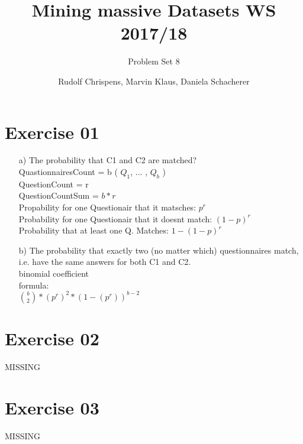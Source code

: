 \documentclass[11pt,a4paper]{scrartcl}
\title{Mining massive Datasets WS 2017/18}
\subtitle{Problem Set 8}
\author{Rudolf Chrispens, Marvin Klaus, Daniela Schacherer}
\begin{document}
\maketitle

\section*{Exercise 01}

\begin{itemize}
	\item[a)] The probability that C1 and C2 are matched?\\
	QuastionnairesCount = b ( $Q_1$, ... , $Q_b$ )\\
	QuestionCount = r \\
	QuestionCountSum = $b * r$\\
	Propability for one Questionair that it matsches: $p^r$\\
	Probability for one Questionair that it doesnt match: $(1-p)^r$\\ 
	Probability that at least one Q. Matches: $1-(1-p)^r$
	
	\item[b)] The probability that exactly two (no matter which) questionnaires match, i.e. have
the same answers for both C1 and C2.\\
	binomial coefficient\\
	formula: \\
	$\binom{b}{2} * (p^r)^2 * (1-(p^r))^{b-2}$

\end{itemize} 

\section*{Exercise 02}
MISSING

\section*{Exercise 03}
MISSING
\end{document}
